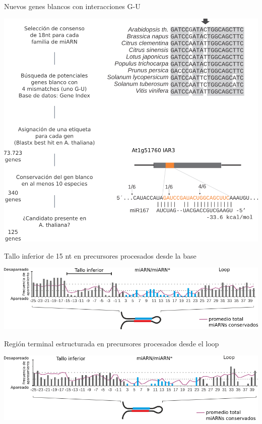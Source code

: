 \documentclass{beamer}
\begin{document}
\begin{frame}{Nuevos genes blancos con interacciones G-U}
	\begin{center}
		\includegraphics[width=.6\textwidth]{img/Figure5_retocada.png}
	\end{center}
\end{frame}

\begin{frame}{Tallo inferior de 15 nt en precursores procesados desde la base}
	\begin{center}
		\includegraphics[width=1\textwidth]{img/GR_fig2C.png}
	\end{center}
\end{frame}

\begin{frame}{Región terminal estructurada en precursores procesados desde el loop}
	\begin{center}
		\includegraphics[width=1\textwidth]{img/GR_fig4C.png}
	\end{center}
\end{frame}
\end{document}

